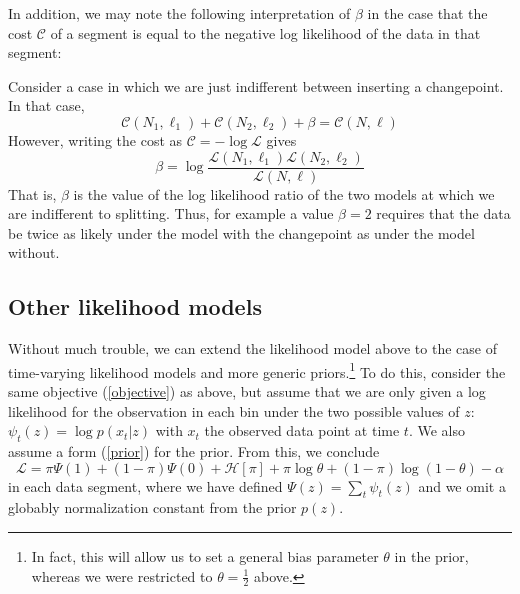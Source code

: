 \documentclass[11pt]{article}
\begin{document}
In addition, we may note the following interpretation of $\beta$ in the case that the cost $\mathcal{C}$ of a segment is equal to the negative log likelihood of the data in that segment:

Consider a case in which we are just indifferent between inserting a changepoint. In that case,
\begin{equation}
    \mathcal{C}(N_1, \ell_1) + \mathcal{C}(N_2, \ell_2) + \beta = \mathcal{C}(N, \ell)
\end{equation}
However, writing the cost as $\mathcal{C} = -\log \mathcal{L}$ gives
\begin{equation}
    \beta = \log \frac{\mathcal{L}(N_1, \ell_1)\mathcal{L}(N_2, \ell_2)}{\mathcal{L}(N, \ell)}
\end{equation}
That is, $\beta$ is the value of the log likelihood ratio of the two models at which we are indifferent to splitting. Thus, for example a value $\beta = 2$ requires that the data be twice as likely under the model with the changepoint as under the model without.

\subsection{Other likelihood models}
\label{generic_derivation}
Without much trouble, we can extend the likelihood model above to the case of time-varying likelihood models and more generic priors.\footnote{In fact, this will allow us to set a general bias parameter $\theta$ in the prior, whereas we were restricted to $\theta = \frac{1}{2}$ above.} To do this, consider the same objective (\ref{objective}) as above, but assume that we are only given a log likelihood for the observation in each bin under the two possible values of $z$: $\psi_t(z) = \log p(x_t|z)$ with $x_t$ the observed data point at time $t$. We also assume a form (\ref{prior}) for the prior. From this, we conclude
\begin{equation}
    \mathcal{L} = \pi \Psi(1) + (1 - \pi) \Psi(0) + \mathcal{H}[\pi] +
    \pi \log \theta + (1 - \pi) \log (1 - \theta) - \alpha 
\end{equation}
in each data segment, where we have defined $\Psi(z) = \sum_t \psi_t(z)$ and we omit a globably normalization constant from the prior $p(z)$.
\end{document}
